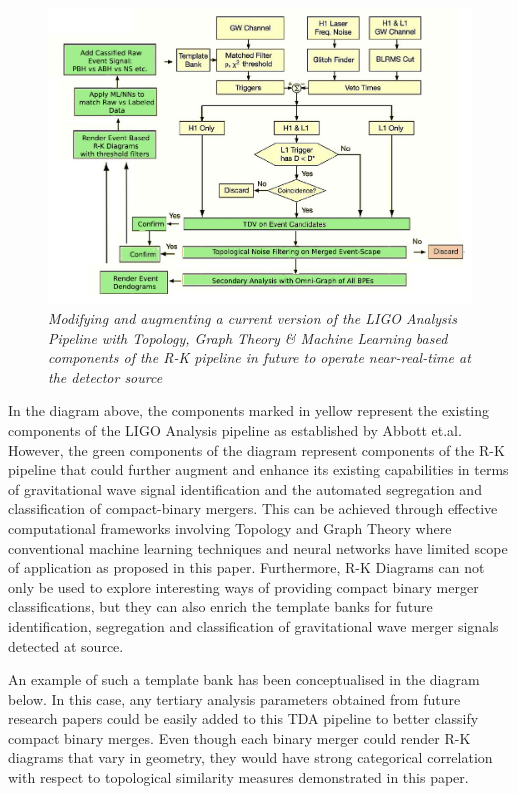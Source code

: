 \begin{figure}[H]
	\centering
	\includegraphics[width=1.0\linewidth]{images/Modified-TDA-LIGO-Analysis-Pipeline.jpg}
	\caption{\textit{Modifying and augmenting a current version of the LIGO Analysis Pipeline with
			Topology, Graph Theory \& Machine Learning based components of the R-K pipeline in future to operate near-real-time at the detector source}}
	\label{fig:odified-TDA-LIGO-Analysis-Pipeline}
\end{figure}

In the diagram above, the components marked in yellow represent the existing components of the LIGO Analysis pipeline  as established by Abbott et.al. However, the green components of the diagram represent components of the R-K pipeline that could further augment and enhance its existing capabilities in terms of gravitational wave signal identification and the automated segregation and classification of compact-binary mergers. This can be achieved through effective computational frameworks involving Topology and Graph Theory where conventional machine learning techniques and neural networks have limited scope of application as proposed in this paper. Furthermore, R-K Diagrams can not only be used to explore  interesting ways of providing compact binary merger classifications, but they can also enrich the template banks for future identification, segregation and classification of gravitational wave merger signals detected at source.

An example of such a template bank has been conceptualised in the diagram below. In this case, any tertiary analysis  parameters obtained from future research papers could be easily added to this TDA pipeline  to better classify compact binary merges. Even though each binary merger could render R-K diagrams that vary in geometry, they would have strong categorical correlation with respect to topological similarity measures demonstrated in this paper.
 

